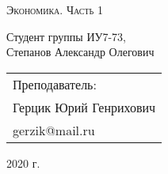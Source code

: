 \begin{center}
    \LARGE
    \textsc{Экономика. Часть 1}
\end{center}

\vspace{3cm}

\begin{center}
    \large

    Студент группы ИУ7-73,\\
    Степанов Александр Олегович
    \vfill
\end{center}

\begin{flushright}
    \large
    \begin{tabular}{l}
        Преподаватель: \\
        Герцик Юрий Генрихович \\
        gerzik@mail.ru \\
    \end{tabular}
\end{flushright}

\begin{center}
    2020 г.
\end{center}
